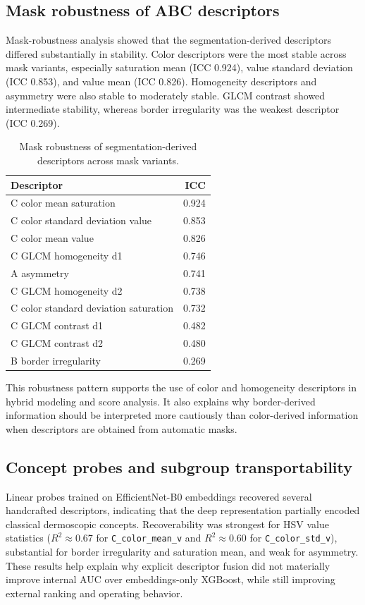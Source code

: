 \documentclass[preprint,12pt]{elsarticle}
\begin{document}
\subsection{Mask robustness of ABC descriptors}

Mask-robustness analysis showed that the segmentation-derived descriptors differed substantially in stability. Color descriptors were the most stable across mask variants, especially saturation mean (ICC 0.924), value standard deviation (ICC 0.853), and value mean (ICC 0.826). Homogeneity descriptors and asymmetry were also stable to moderately stable. GLCM contrast showed intermediate stability, whereas border irregularity was the weakest descriptor (ICC 0.269).

\begin{table}[htbp]
\centering
\caption{Mask robustness of segmentation-derived descriptors across mask variants.}
\label{tab:mask_robustness_icc}
\begin{tabular}{lr}
\toprule
Descriptor & ICC \\
\midrule
C color mean saturation & 0.924 \\
C color standard deviation value & 0.853 \\
C color mean value & 0.826 \\
C GLCM homogeneity d1 & 0.746 \\
A asymmetry & 0.741 \\
C GLCM homogeneity d2 & 0.738 \\
C color standard deviation saturation & 0.732 \\
C GLCM contrast d1 & 0.482 \\
C GLCM contrast d2 & 0.480 \\
B border irregularity & 0.269 \\
\bottomrule
\end{tabular}
\end{table}

This robustness pattern supports the use of color and homogeneity descriptors in hybrid modeling and score analysis. It also explains why border-derived information should be interpreted more cautiously than color-derived information when descriptors are obtained from automatic masks.

\subsection{Concept probes and subgroup transportability}

Linear probes trained on EfficientNet-B0 embeddings recovered several handcrafted descriptors, indicating that the deep representation partially encoded classical dermoscopic concepts. Recoverability was strongest for HSV value statistics ($R^2 \approx 0.67$ for \texttt{C\_color\_mean\_v} and $R^2 \approx 0.60$ for \texttt{C\_color\_std\_v}), substantial for border irregularity and saturation mean, and weak for asymmetry. These results help explain why explicit descriptor fusion did not materially improve internal AUC over embeddings-only XGBoost, while still improving external ranking and operating behavior.
\end{document}
